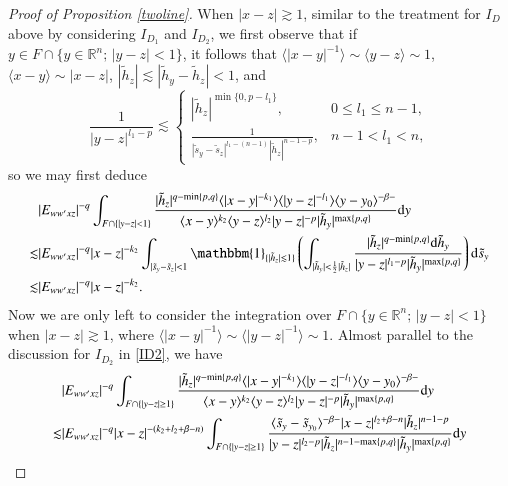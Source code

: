 \documentclass[11pt,reqno]{amsart}
\def\d{{\rm d}}
\numberwithin{equation}{section}
\theoremstyle{definition}
\begin{document}
\begin{appendix}
\begin{proof}[Proof of Proposition \ref{twoline}]
		When $|x-z|\gtrsim1$, similar to the treatment for $I_D$ above by considering $I_{D_1}$ and $I_{D_2}$, we first observe that if $y\in F\cap\{y\in\mathbb{R}^n;\,|y-z|<1\}$, it follows that $\langle|x-y|^{-1}\rangle\sim\langle y-z\rangle\sim1$, $\langle x-y\rangle\sim|x-z|$, $|\tilde{h}_z|\lesssim|\tilde{h}_y-\tilde{h}_z|<1$, and
		\begin{equation*}
			\frac{1}{|y-z|^{l_1-p}}\lesssim\begin{cases}
				|\tilde{h}_z|^{\min\{0,p-l_1\}},&0\leq l_1\leq n-1,\\
				\frac{1}{|\tilde{s}_y-\tilde{s}_z|^{l_1-(n-1)}|\tilde{h}_z|^{n-1-p}},&n-1<l_1<n,
			\end{cases}
		\end{equation*}
		so we may first deduce
		\begin{equation*}
			\begin{split}
				&|E_{ww'xz}|^{-q}\int_{F\cap\{|y-z|<1\}}\frac{|\tilde{h}_z|^{q-\min\{p,q\}}\langle|x-y|^{-k_1}\rangle\langle|y-z|^{-l_1}\rangle\langle y-y_0\rangle^{-\beta-}}{\langle x-y\rangle^{k_2}\langle y-z\rangle^{l_2}|y-z|^{-p}|\tilde{h}_y|^{\max\{p,q\}}}\d y\\
				\lesssim&|E_{ww'xz}|^{-q}|x-z|^{-k_2}\int_{|\tilde{s}_y-\tilde{s}_z|<1}\mathbbm{1}_{\{|\tilde{h}_z|\lesssim1\}}\left(\int_{|\tilde{h}_y|<\frac12|\tilde{h}_z|}\frac{|\tilde{h}_z|^{q-\min\{p,q\}}\d\tilde{h}_y}{|y-z|^{l_1-p}|\tilde{h}_y|^{\max\{p,q\}}}\right)\d\tilde{s}_y\\
				\lesssim&|E_{ww'xz}|^{-q}|x-z|^{-k_2}.
			\end{split}
		\end{equation*}
		Now we are only left to consider the integration over $F\cap\{y\in\mathbb{R}^n;\,|y-z|<1\}$ when $|x-z|\gtrsim1$, where $\langle|x-y|^{-1}\rangle\sim\langle|y-z|^{-1}\rangle\sim1$. Almost parallel to the discussion for $I_{D_2}$ in \eqref{ID2}, we have
		\begin{equation*}
			\begin{split}
				&|E_{ww'xz}|^{-q}\int_{F\cap\{|y-z|\geq1\}}\frac{|\tilde{h}_z|^{q-\min\{p,q\}}\langle|x-y|^{-k_1}\rangle\langle|y-z|^{-l_1}\rangle\langle y-y_0\rangle^{-\beta-}}{\langle x-y\rangle^{k_2}\langle y-z\rangle^{l_2}|y-z|^{-p}|\tilde{h}_y|^{\max\{p,q\}}}\d y\\
				\lesssim&|E_{ww'xz}|^{-q}|x-z|^{-(k_2+l_2+\beta-n)}\int_{F\cap\{|y-z|\geq1\}}\frac{\langle\tilde{s}_y-\tilde{s}_{y_0}\rangle^{-\beta-}|x-z|^{l_2+\beta-n}|\tilde{h}_z|^{n-1-p}}{|y-z|^{l_2-p}|\tilde{h}_z|^{n-1-\max\{p,q\}}|\tilde{h}_y|^{\max\{p,q\}}}\d y\\

\end{split}
\end{equation*}
\end{proof}
\end{appendix}
\end{document}
